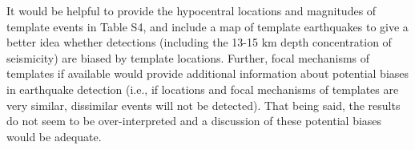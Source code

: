 \documentclass[10pt]{extarticle}
\begin{document}
\begin{ReviewerComment}{1}
\noindent 
It would be helpful to provide the hypocentral locations and magnitudes of template events in Table S4, and include a map of template earthquakes to give a better idea whether detections (including the 13-15 km depth concentration of seismicity) are biased by template locations. Further, focal mechanisms of templates if available would provide additional information about potential biases in earthquake detection (i.e., if locations and focal mechanisms of templates are very similar, dissimilar events will not be detected). That being said, the results do not seem to be over-interpreted and a discussion of these potential biases would be adequate.

\end{ReviewerComment}
\end{document}
